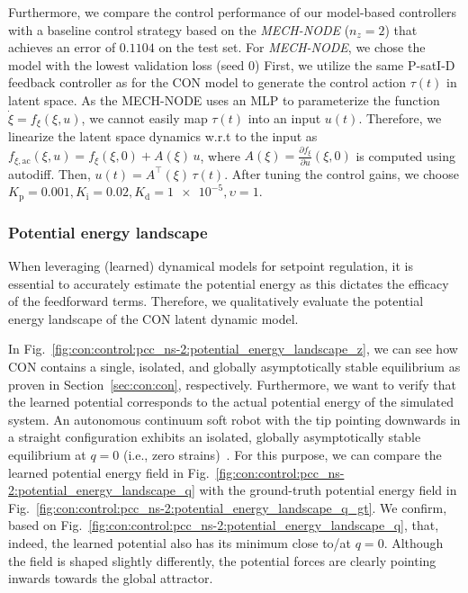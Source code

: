 Furthermore, we compare the control performance of our model-based controllers with a baseline control strategy based on the \emph{MECH-NODE} ($n_z = 2$) that achieves an error of $0.1104$ on the test set.
For \emph{MECH-NODE}, we chose the model with the lowest validation loss (seed $0$)
First, we utilize the same P-satI-D feedback controller as for the \gls{CON} model to generate the control action $\tau(t)$ in latent space. 
As the MECH-NODE uses an \gls{MLP} to parameterize the function $\dot{\xi} = f_\xi(\xi, u)$, we cannot easily map $\tau(t)$ into an input $u(t)$. 
Therefore, we linearize the latent space dynamics w.r.t to the input as $f_{\xi,\mathrm{ac}}(\xi, u) = f_\xi(\xi, 0) + A(\xi) \, u$, where $A(\xi) = \frac{\partial f_\xi}{\partial u}(\xi, 0)$ is computed using autodiff. Then, $u(t) = A^\top(\xi) \, \tau(t)$. After tuning the control gains, we choose  $K_\mathrm{p} = 0.001, K_\mathrm{i}=0.02, K_\mathrm{d} = \num{1e-5}, \upsilon = 1$.

\subsubsection{Potential energy landscape}
When leveraging (learned) dynamical models for setpoint regulation, it is essential to accurately estimate the potential energy as this dictates the efficacy of the feedforward terms. Therefore, we qualitatively evaluate the potential energy landscape of the \gls{CON} latent dynamic model.

In Fig.~\ref{fig:con:control:pcc_ns-2:potential_energy_landscape_z}, we can see how \gls{CON} contains a single, isolated, and globally asymptotically stable equilibrium as proven in Section~\ref{sec:con:con}, respectively. 
% 
Furthermore, we want to verify that the learned potential corresponds to the actual potential energy of the simulated system.
An autonomous continuum soft robot with the tip pointing downwards in a straight configuration exhibits an isolated, globally asymptotically stable equilibrium at $q = 0$ (i.e., zero strains)~\citep{stolzle2021piston}.
For this purpose, we can compare the learned potential energy field in Fig.~\ref{fig:con:control:pcc_ns-2:potential_energy_landscape_q} with the ground-truth potential energy field in Fig.~\ref{fig:con:control:pcc_ns-2:potential_energy_landscape_q_gt}.
We confirm, based on Fig.~\ref{fig:con:control:pcc_ns-2:potential_energy_landscape_q}, that, indeed, the learned potential also has its minimum close to/at $q=0$. Although the field is shaped slightly differently, the potential forces are clearly pointing inwards towards the global attractor.

